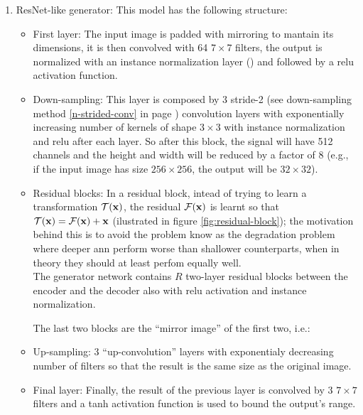 \documentclass[../main.tex]{subfiles}
\begin{document}
\begin{enumerate}
  \item ResNet-like generator: This model has the following structure:
  \begin{itemize}
    \item First layer: The input image is padded with mirroring to mantain its
    dimensions, it is then convolved with 64 $7 \times 7$ filters, the output
    is normalized with an instance normalization layer
    (\cite{ulyanov2016instance}) and followed by a \gls{relu} activation function.

    \item Down-sampling: This layer is composed by 3 stride-2
    (see down-sampling method \ref{n-strided-conv} in page
    \pageref{n-strided-conv}) convolution
    layers with exponentially increasing number of kernels of shape $3 \times 3$
    with instance normalization and \gls{relu} after each layer. So after this
    block, the signal will have 512 channels and the height and width will
    be reduced by a factor of 8 (e.g., if the input image has size
    $256 \times 256$, the output will be $32 \times 32$).

    \item Residual blocks: In a residual block, intead of trying to learn
    a transformation $\mathcal{T}(\mathbf{x})$, the residual
    $\mathcal{F}(\mathbf{x})$ is learnt so that
    $\mathcal{T}(\mathbf{x}) = \mathcal{F}(\mathbf{x}) + \mathbf{x}$
    (ilustrated in figure \ref{fig:residual-block});
    the motivation behind this is to
    avoid the problem know as the degradation problem where deeper \gls{ann}
    perform worse than shallower counterparts, when in theory they should at
    least perfom equally well.\\
    The generator network contains $R$ two-layer residual blocks between
    the encoder and the decoder also with \gls{relu} activation and
    instance normalization.

The last two blocks are the ``mirror image'' of the first two, i.e.:

    \item Up-sampling\footnotemark[\value{footnote}]{}:
    3 ``up-convolution'' layers with exponentialy decreasing
    number of filters so that the result is the same size as the original image.

    \item Final layer: Finally, the result of the previous layer is convolved
    by 3 $7 \times 7$ filters and a tanh activation function is used to
    bound the output's range.
  \end{itemize}


\end{enumerate}
\end{document}
